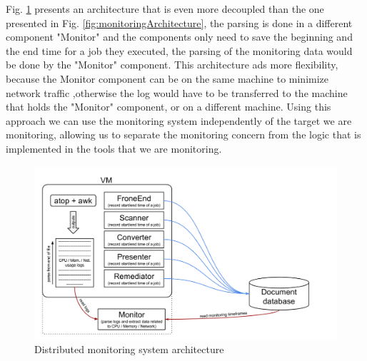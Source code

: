 Fig. \ref{fig:monitoringArchitectureExtended}  presents an architecture that is even more decoupled than the one presented in Fig. \ref{fig:monitoringArchitecture}, the parsing is done in a different component "Monitor" and the components only need to save the beginning and the end time for a job they executed, the parsing of the monitoring data would be done by the "Monitor" component. This architecture ads more flexibility, because the Monitor component can be on the same machine to minimize network traffic ,otherwise the log would have to be transferred to the machine that holds the "Monitor" component, or on a different machine. Using this approach we can use the monitoring system independently of the target we are monitoring, allowing us to separate the monitoring concern from the logic that is implemented in the tools that we are monitoring.


\begin{figure}
\centering
\includegraphics[width=\linewidth]{./img/MonitoringCPUMechanismExtended.png}
\caption{Distributed monitoring system architecture}
\label{fig:monitoringArchitectureExtended}
\end{figure}
